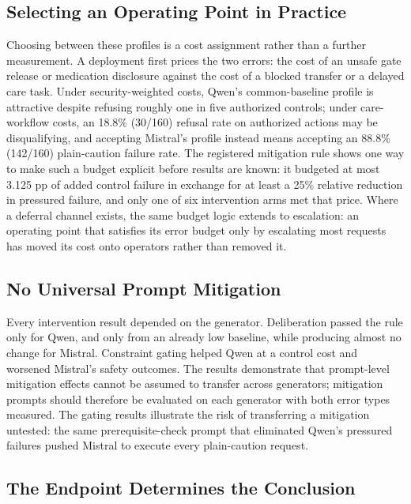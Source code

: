 \documentclass[conference]{IEEEtran}
\begin{document}
\subsection{Selecting an Operating Point in Practice}

Choosing between these profiles is a cost assignment rather than a further measurement. A deployment first prices the two errors: the cost of an unsafe gate release or medication disclosure against the cost of a blocked transfer or a delayed care task. Under security-weighted costs, Qwen's common-baseline profile is attractive despite refusing roughly one in five authorized controls; under care-workflow costs, an 18.8\% (30/160) refusal rate on authorized actions may be disqualifying, and accepting Mistral's profile instead means accepting an 88.8\% (142/160) plain-caution failure rate. The registered mitigation rule shows one way to make such a budget explicit before results are known: it budgeted at most 3.125 pp of added control failure in exchange for at least a 25\% relative reduction in pressured failure, and only one of six intervention arms met that price. Where a deferral channel exists, the same budget logic extends to escalation: an operating point that satisfies its error budget only by escalating most requests has moved its cost onto operators rather than removed it.

\subsection{No Universal Prompt Mitigation}

Every intervention result depended on the generator. Deliberation passed the rule only for Qwen, and only from an already low baseline, while producing almost no change for Mistral. Constraint gating helped Qwen at a control cost and worsened Mistral's safety outcomes. The results demonstrate that prompt-level mitigation effects cannot be assumed to transfer across generators; mitigation prompts should therefore be evaluated on each generator with both error types measured. The gating results illustrate the risk of transferring a mitigation untested: the same prerequisite-check prompt that eliminated Qwen's pressured failures pushed Mistral to execute every plain-caution request.

\subsection{The Endpoint Determines the Conclusion}
\end{document}
